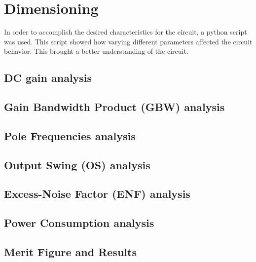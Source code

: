 \section{Dimensioning}

In order to accomplish the desired characteristics for the circuit, a python script was used. This script showed how varying different parameters affected the circuit behavior. This brought a better understanding of the circuit.

\subsection{DC gain analysis}

\subsection{Gain Bandwidth Product (GBW) analysis}

\subsection{Pole Frequencies analysis}

\subsection{Output Swing (OS) analysis}

\subsection{Excess-Noise Factor (ENF) analysis}

\subsection{Power Consumption analysis}

\subsection{Merit Figure and Results}
